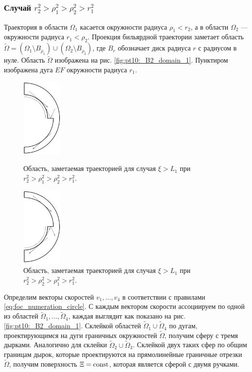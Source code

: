 \subsubsection{Случай $r_2^2 > \rho_1^2 > \rho_2^2 > r_1^2$}\label{s3.9.1}
Траектория в области $\Omega_1$ касается окружности радиуса $\rho_1 < r_2$, а в области $\Omega_2$ --- окружности радиуса $r_1 < \rho_2$. Проекция бильярдной траектории заметает область $\widetilde{\Omega} = (\Omega_1 \setminus B_{\rho_1}) \cup (\Omega_2 \setminus B_{\rho_2})$, где $B_r$ обозначает диск радиуса $r$ с радиусом в нуле. Область $\widetilde{\Omega}$ изображена на рис. \ref{fig:pt10:_B2_domain_1}. Пунктиром изображена дуга $EF$ окружности радиуса $r_1$. 
\begin{figure}[!htb]
\centering
\includegraphics[width=2cm]{images/section3_circular/atoms/sect3_B2_domain_1.pdf}
    \caption{Область, заметаемая траекторией для случая $\xi > L_1$ при $r_2^2 > \rho_1^2 > \rho_2^2 > r_1^2$.}
    \label{fig:pt10:_B2_domain_1}
\endminipage\hfill
{}
\centering
\includegraphics[width=2cm]{images/section3_circular/atoms/sect3_B2_domain_2.pdf}
    \caption{Область, заметаемая траекторией для случая $\xi > L_1$ при $r_2^2 > \rho_2^2 > \rho_1^2 > r_1^2$.}
        \label{fig:pt10:_B2_domain_2}
\endminipage\hfill
\end{figure}

Определим векторы скоростей $v_1, \ldots, v_4$ в соответствии с правилами \eqref{eq:foc_numeration_circle}. С каждым вектором скорости ассоциируем по одной из областей $\widetilde{\Omega}_1, \ldots, \widetilde{\Omega}_4$, каждая выглядит как показано на  рис. \ref{fig:pt10:_B2_domain_1}. 
Склейкой областей $\widetilde{\Omega}_1 \cup \widetilde{\Omega}_4$ по дугам, проектирующимся на дуги граничных окружностей $\widetilde{\Omega}$, получим сферу с тремя дырками. Аналогично для склейки $\widetilde{\Omega}_2 \cup \widetilde{\Omega}_3$. Склейкой двух таких сфер по общим границам дырок, которые проектируются на прямолинейные граничные отрезки $\widetilde{\Omega}$, получим поверхность $\Xi=\mathrm{const}$, которая является сферой с двумя ручками. 

